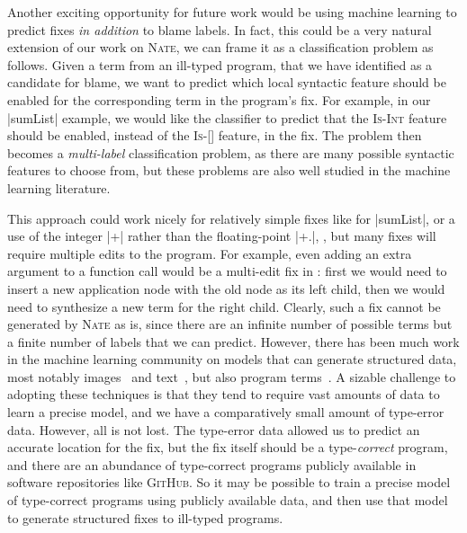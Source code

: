 Another exciting opportunity for future work would be using machine
learning to predict fixes \emph{in addition} to blame labels.
%
In fact, this could be a very natural extension of our work on
\textsc{Nate}, we can frame it as a classification problem as follows.
%
Given a term from an ill-typed program, that we have identified as a
candidate for blame, we want to predict which local syntactic feature
should be enabled for the corresponding term in the program's fix.
%
For example, in our |sumList| example, we would like the classifier to
predict that the \textsc{Is-Int} feature should be enabled, instead of
the \textsc{Is-[]} feature, in the fix.
%
The problem then becomes a \emph{multi-label} classification problem, as
there are many possible syntactic features to choose from, but these
problems are also well studied in the machine learning literature.

This approach could work nicely for relatively simple fixes like for
|sumList|, or a use of the integer |+| rather than the floating-point
|+.|, \etc, but many fixes will require multiple edits to the program.
%
For example, even adding an extra argument to a function call would be a
multi-edit fix in \ocaml: first we would need to insert a new
application node with the old node as its left child, then we would need
to synthesize a new term for the right child.
%
Clearly, such a fix cannot be generated by \textsc{Nate} as is, since
there are an infinite number of possible terms but a finite number of
labels that we can predict.
%
However, there has been much work in the machine learning community on
models that can generate structured data, most notably
images~\citep{Gregor2015-ra} and text~\citep{Bahdanau2014-gt}, but also
program terms~\citep{Raychev2016-xk,Raychev2014-jv}.
%
A sizable challenge to adopting these techniques is that they tend to
require vast amounts of data to learn a precise model, and we have a
comparatively small amount of type-error data.
%
However, all is not lost.
%
The type-error data allowed us to predict an accurate location for the
fix, but the fix itself should be a type-\emph{correct} program, and
there are an abundance of type-correct programs publicly available in
software repositories like \textsc{GitHub}.
%
So it may be possible to train a precise model of type-correct programs
using publicly available data, and then use that model to generate
structured fixes to ill-typed programs.



